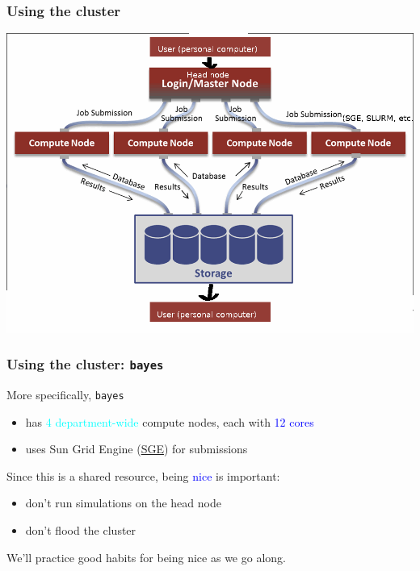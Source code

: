 \documentclass[12pt, 
hyperref={colorlinks=true, linkcolor=BlueViolet, urlcolor=BlueViolet},dvipsnames]{beamer}
\begin{document}
\begin{frame}
\frametitle{Using the cluster}
\begin{center}
\includegraphics[width = 1\textwidth]{plots/hpc_system.png}
\end{center}
\end{frame}

\begin{frame}
\frametitle{Using the cluster: \texttt{bayes}}
More specifically, \texttt{bayes} \vspace{-0.3cm} \pause
\begin{itemize}
\item has \textcolor{cyan}{4 department-wide} compute nodes, each with \textcolor{blue}{12 cores} \pause
\item uses Sun Grid Engine (\href{https://en.wikipedia.org/wiki/Oracle_Grid_Engine}{SGE}) for submissions \pause
\end{itemize}

Since this is a shared resource, being \textcolor{blue}{nice} is important: \vspace{-0.3cm} \pause
\begin{itemize}
\item don't run simulations on the head node \pause
\item don't flood the cluster \pause
\end{itemize}

We'll practice good habits for being nice as we go along.
\end{frame}
\end{document}
